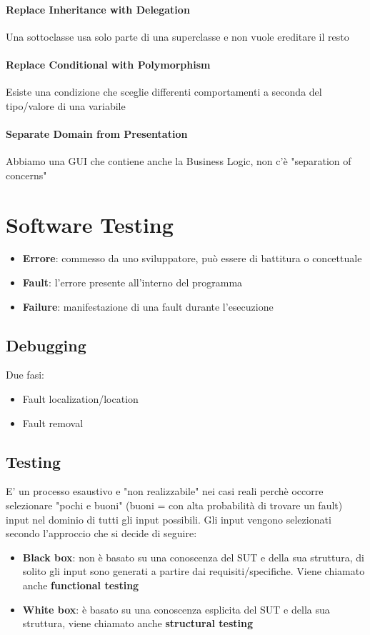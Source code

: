 \documentclass[12pt, a4paper]{report}
\begin{document}
\subsubsection{Replace Inheritance with Delegation}
Una sottoclasse usa solo parte di una superclasse e non vuole ereditare il resto
\subsubsection{Replace Conditional with Polymorphism}
Esiste una condizione che sceglie differenti comportamenti a seconda del tipo/valore di una variabile
\subsubsection{Separate Domain from Presentation}
Abbiamo  una GUI che contiene anche la Business Logic, non c'è "separation of concerns"
\chapter{Software Testing}
\begin{itemize}
    \item \textbf{Errore}: commesso da uno sviluppatore, può essere di battitura o concettuale
    \item \textbf{Fault}: l'errore presente all'interno del programma
    \item \textbf{Failure}: manifestazione di una fault durante l'esecuzione
\end{itemize}
\section{Debugging}
Due fasi:
\begin{itemize}
    \item Fault localization/location
    \item Fault removal
\end{itemize}
\section{Testing}
E' un processo esaustivo e "non realizzabile" nei casi reali perchè occorre selezionare "pochi e buoni" (buoni = con alta probabilità di trovare un fault) input nel dominio di tutti gli input possibili.
Gli input vengono selezionati secondo l'approccio che si decide di seguire:
\begin{itemize}
    \item \textbf{Black box}: non è basato su una conoscenza del SUT e della sua struttura, di solito gli input sono generati a partire dai requisiti/specifiche. Viene chiamato anche \textbf{functional testing}
    \item \textbf{White box}: è basato su una conoscenza esplicita del SUT e della sua struttura, viene chiamato anche \textbf{structural testing}
\end{itemize}
\end{document}
